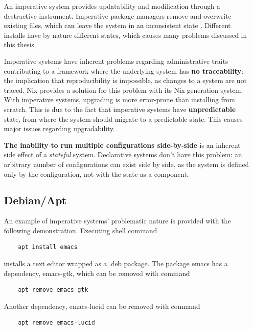 An imperative system provides updatability and modification through a
destructive instrument. Imperative package managers remove and overwrite existing files, which can leave the system in an
inconsistent state \cite{dolstra2008nixos}. Different installs have by
nature different states, which causes many problems discussed in this
thesis.

Imperative systems have inherent problems regarding
administrative traits contributing to a framework where the underlying
system has \textbf{no traceability}: the implication that
reproducibility is impossible, as changes to a system are not
traced. Nix provides a solution for this problem with its Nix
generation system. With
imperative systems, upgrading is more error-prone than installing from
scratch. This is due to the fact that imperative systems have
\textbf{unpredictable} state, from where the system should migrate to
a predictable state. This causes major issues regarding
upgradability. \cite{dolstra2007purely}

\textbf{The inability to run multiple configurations side-by-side} is
an inherent side effect of a \textit{stateful} system. Declarative
systems don't have this problem: an arbitrary number of configurations
can exist side by side, as the system is defined only by the
configuration, not with the state as a
component. \cite{dolstra2007purely}

\subsection{Debian/Apt}

An example of imperative systems' problematic nature is provided with
the following demonstration. Executing shell command
\begin{lstlisting}
    apt install emacs
\end{lstlisting}
installs a text editor wrapped as a .deb package.  The package emacs
has a dependency, emacs-gtk, which can be removed with command
\begin{lstlisting}
    apt remove emacs-gtk
\end{lstlisting}
Another dependency, emacs-lucid can be removed with command
\begin{lstlisting}
    apt remove emacs-lucid
\end{lstlisting}

